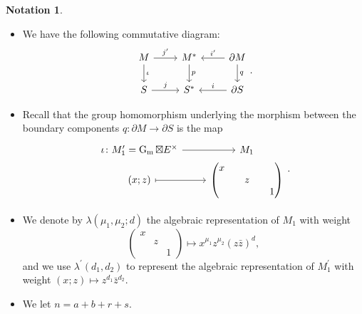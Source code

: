 \documentclass[11pt, a4paper]{amsart}
\theoremstyle{plain}
\theoremstyle{definition}
\newtheorem{notation}[theorem]{Notation}
\numberwithin{equation}{section}
\DeclareMathOperator{\Gm}{\mathrm{G_{m}}}
\begin{document}
\begin{notation}
\begin{itemize}
    \item 
        We have the following commutative diagram:
        \begin{equation*}
                    \begin{tikzcd}
                        M \ar[r, "j^{\prime}"] \ar[d, "{\iota}"] & M^{*} \ar[d, "p"] & \partial{M} \ar[l, "i^{\prime}" above] \ar[d, "q"] \\
                        S \ar[r, "j"] & S^{*} & \partial{S} \ar[l, "i" above]  
                    \end{tikzcd}. 
            \end{equation*}
    \item Recall that the group homomorphism underlying the morphism between the boundary components $q \colon \partial M \rightarrow \partial S$ is      the map 
           \begin{equation}
           \label{eq: group embedding boundary}
                \begin{tikzcd}[row sep = 0]
                    {\iota} \colon M_1^{\prime} = \Gm \boxtimes E^{\times} \ar[r] & M_1 \\ (x; z) \ar[r, mapsto] & \begin{pmatrix}
                                                                                                                x & &  \\
                                                                                                                & z & \\
                                                                                                                & & 1 
                                                                                                            \end{pmatrix}
                 \end{tikzcd}. 
            \end{equation}
    \item We denote by $\lambda(\mu_1, \mu_2; d)$ the algebraic representation of $M_{1}$ with weight 
    \begin{equation}
    \label{eq: rep of G_1}
        \begin{pmatrix}
            x & &  \\
            & z & \\
            & & 1 
        \end{pmatrix} \mapsto x^{\mu_1}z^{\mu_2}(z\bar{z})^{d}, 
    \end{equation} 
    and we use $\lambda^{\prime}(d_1, d_2)$ to represent the algebraic representation of $M_1^{\prime}$ with weight $(x; z) \mapsto z^{d_1}\bar{z}^{d_2}$.
    \item We let $n = a + b + r + s$. 
\end{itemize}
\end{notation}
\end{document}
